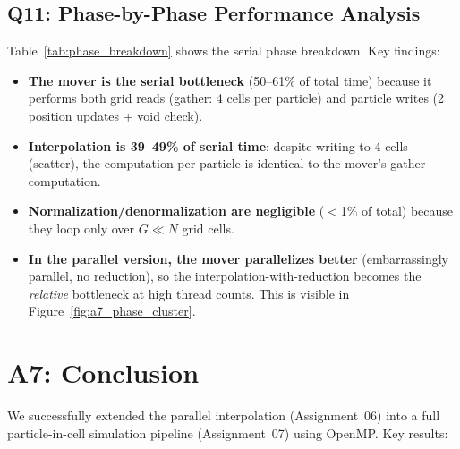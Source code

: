 \documentclass[12pt,a4paper]{article}
\begin{document}
\subsection{Q11: Phase-by-Phase Performance Analysis}

Table~\ref{tab:phase_breakdown} shows the serial phase breakdown. Key findings:

\begin{itemize}
    \item \textbf{The mover is the serial bottleneck} (50--61\% of total time) because
          it performs both grid reads (gather: 4 cells per particle) and particle writes
          (2 position updates + void check).
    \item \textbf{Interpolation is 39--49\% of serial time}: despite writing to 4 cells
          (scatter), the computation per particle is identical to the mover's gather
          computation.
    \item \textbf{Normalization/denormalization are negligible} ($<$1\% of total) because
          they loop only over $G \ll N$ grid cells.
    \item \textbf{In the parallel version, the mover parallelizes better} (embarrassingly
          parallel, no reduction), so the interpolation-with-reduction becomes the
          \textit{relative} bottleneck at high thread counts. This is visible in
          Figure~\ref{fig:a7_phase_cluster}.
\end{itemize}

\section{A7: Conclusion}

We successfully extended the parallel interpolation (Assignment~06) into a full
particle-in-cell simulation pipeline (Assignment~07) using OpenMP. Key results:
\end{document}
